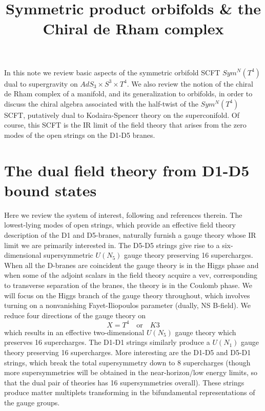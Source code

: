 \documentclass[11pt]{amsart}
\date{}
\title{Symmetric product orbifolds \& the Chiral de Rham complex}
\theoremstyle{thm}
\numberwithin{equation}{subsection}
\theoremstyle{def}
\theoremstyle{rem}
\begin{document}
 
\maketitle

In this note we review basic aspects of the symmetric orbifold SCFT $Sym^N(T^4)$ dual to supergravity on $AdS_3 \times S^3 \times T^4$. We also review the notion of the chiral de Rham complex of a manifold, and its generalization to orbifolds, in order to discuss the chiral algebra associated with the half-twist of the $Sym^N(T^4)$ SCFT, putatively dual to Kodaira-Spencer theory on the superconifold. Of course, this SCFT is the IR limit of the field theory that arises from the zero modes of the open strings on the D1-D5 branes. 

\section{The dual field theory from D1-D5 bound states}

Here we review the system of interest, following \cite{Davidetal} and references therein. The lowest-lying modes of open strings, which provide an effective field theory description of the D1 and D5-branes, naturally furnish a gauge theory whose IR limit we are primarily interested in.  
The D5-D5 strings give rise to a six-dimensional supersymmetric $U(N_5)$ gauge theory preserving 16 supercharges. 
When all the D-branes are coincident the gauge theory is in the Higgs phase and when some of the adjoint scalars in the field theory acquire a vev, corresponding to transverse separation of the branes, the theory is in the Coulomb phase. 
We will focus on the Higgs branch of the gauge theory throughout, which involves turning on a nonvanishing Fayet-Iliopoulos parameter (dually, NS B-field). 
We reduce four directions of the gauge theory on 
\[
X = T^4 \quad \text{or} \quad K3
\]
which results in an effective two-dimensional $U(N_5)$ gauge theory which preserves 16 supercharges.
The D1-D1 strings similarly produce a $U(N_1)$ gauge theory preserving 16 supercharges. 
More interesting are the D1-D5 and D5-D1 strings, which break the total supersymmetry down to 8 supercharges (though more supersymmetries will be obtained in the near-horizon/low energy limits, so that the dual pair of theories has 16 supersymmetries overall). 
These strings produce matter multiplets transforming in the bifundamental representations of the gauge groups. 
\end{document}
